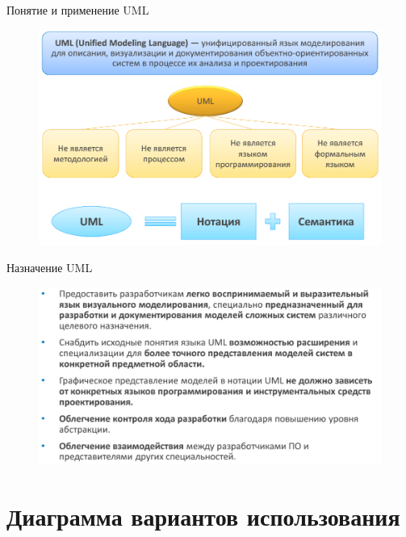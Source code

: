 \documentclass{beamer}
\begin{document}
\begin{frame}[t]{Понятие и применение UML}
\begin{figure}[h]
\centering
\includegraphics[scale=0.45]{images/lec03-pic04.png}
\end{figure}
\end{frame}

\begin{frame}[t]{Назначение UML}
\begin{figure}[h]
\centering
\includegraphics[scale=0.5]{images/lec03-pic05.png}
\end{figure}
\end{frame}

\section{Диаграмма вариантов использования}
\end{document}

